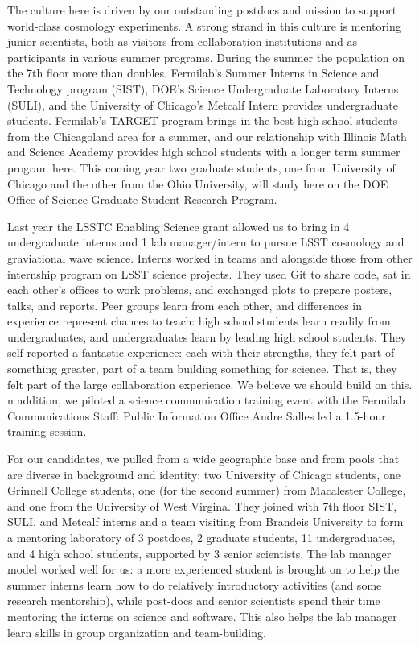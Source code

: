The culture here is driven by our outstanding postdocs and mission to support
world-class cosmology experiments. A strong strand in this culture is mentoring
junior scientists, both  as visitors from collaboration institutions and as participants
in various summer programs.
During the summer the population on the 7th floor more than doubles.
Fermilab's Summer Interns in Science and Technology program (SIST),
DOE's Science Undergraduate Laboratory Interns (SULI), and the University of
Chicago's Metcalf Intern provides undergraduate students. 
Fermilab's TARGET program brings in the best high school 
students from the Chicagoland area for a summer, 
and our relationship with Illinois Math and Science Academy provides
high school students with a longer term summer program here.
This coming year two graduate students, one from University of Chicago and the
other from the Ohio University, will study here on the DOE Office of Science
Graduate Student Research Program.

Last year the LSSTC Enabling Science grant allowed us to bring in
4 undergraduate interns and 1 lab manager/intern to pursue LSST
cosmology and graviational wave science. 
Interns worked in teams and alongside those from other internship program on LSST science projects. 
They used Git to share code, sat in each other's offices to work problems, and exchanged plots to prepare posters, talks, and reports. 
Peer groups learn from each other,
and differences in experience represent chances to teach: high school
students learn readily from undergraduates, and undergraduates learn
by leading high school students. 
They self-reported a fantastic experience: each with their strengths,
they felt part of something greater, part of a team building something 
for science. That is, they felt part of the large collaboration experience.
We believe we should build on this.
n addition, we piloted a science communication training event with the Fermilab Communications Staff: Public Information Office Andre Salles led a 1.5-hour training session.

For our candidates, we pulled from a wide geographic base and from pools that are diverse in background and identity:
two University of Chicago students, one Grinnell College students, 
one (for the second summer) from Macalester College, and
one from the University of West Virgina. They joined with 7th floor SIST, SULI,
and Metcalf interns and a team visiting from Brandeis University to form
a mentoring laboratory of 3 postdocs, 2 graduate students, 11 undergraduates, and 4
high school students,
supported by 3 senior scientists. The lab manager model worked well for us:
a more experienced student is brought on to help the summer interns
learn how to do relatively introductory activities (and some research mentorship), while post-docs and senior scientists spend
their time mentoring the interns on science and software.
This also helps the lab manager learn skills in group organization and team-building.


